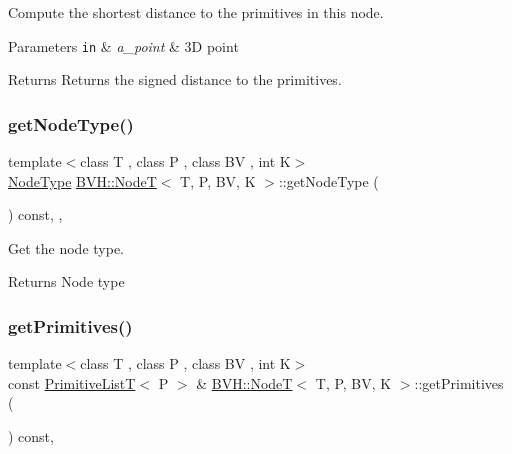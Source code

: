 Compute the shortest distance to the primitives in this node. 


\begin{DoxyParams}[1]{Parameters}
\mbox{\tt in}  & {\em a\+\_\+point} & 3D point \\
\hline
\end{DoxyParams}
\begin{DoxyReturn}{Returns}
Returns the signed distance to the primitives. 
\end{DoxyReturn}
\mbox{\label{classBVH_1_1NodeT_a7b9e3a8bfa35f604298634da102a0ce4}} 
\subsubsection{\texorpdfstring{get\+Node\+Type()}{getNodeType()}}
{\footnotesize\ttfamily template$<$class T , class P , class BV , int K$>$ \\
\hyperlink{namespaceBVH_a7613f83a60cfae9aba31861110bd9e54}{Node\+Type} \hyperlink{classBVH_1_1NodeT}{B\+V\+H\+::\+NodeT}$<$ T, P, BV, K $>$\+::get\+Node\+Type (\begin{DoxyParamCaption}{ }\end{DoxyParamCaption}) const\hspace{0.3cm}{\ttfamily [inline]}, {\ttfamily [protected]}, {\ttfamily [noexcept]}}



Get the node type. 

\begin{DoxyReturn}{Returns}
Node type 
\end{DoxyReturn}
\mbox{\label{classBVH_1_1NodeT_a2e0c1e030162a2dc049acb4debd4d9f2}} 
\subsubsection{\texorpdfstring{get\+Primitives()}{getPrimitives()}\hspace{0.1cm}{\footnotesize\ttfamily [1/2]}}
{\footnotesize\ttfamily template$<$class T , class P , class BV , int K$>$ \\
const \hyperlink{namespaceBVH_aa1e753bda451b85cd5b948722a2ad7c7}{Primitive\+ListT}$<$ P $>$ \& \hyperlink{classBVH_1_1NodeT}{B\+V\+H\+::\+NodeT}$<$ T, P, BV, K $>$\+::get\+Primitives (\begin{DoxyParamCaption}{ }\end{DoxyParamCaption}) const\hspace{0.3cm}{\ttfamily [inline]}, {\ttfamily [noexcept]}}



